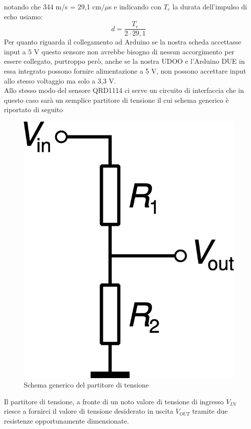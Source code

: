 notando che 344 m/s = 29,1 cm/$\mu$s e indicando con $T_e$ la durata dell'impulso 
di echo usiamo:
$$d=\frac{T_e}{2\cdot29,1}$$
Per quanto riguarda il collegamento ad Arduino se la nostra scheda accettasse 
input a 5 V questo sensore non avrebbe bisogno di nessun accorgimento per essere
 collegato, purtroppo però, anche se la nostra UDOO 
e l'Arduino DUE in essa integrato possono fornire alimentazione a 5 V, non possono 
accettare input allo stesso voltaggio ma solo a 3,3 V. 
\\Allo stesso modo del sensore QRD1114 ci serve un circuito di interfaccia che 
in questo caso sarà un semplice partitore di tensione il cui schema generico è 
riportato di seguito

\begin{figure}[!htb] \center
\includegraphics[scale=0.6]{immagini/Voltage_divider.png}
\caption{Schema generico del partitore di tensione} 
\end{figure}

Il partitore di tensione, a fronte di un noto valore di tensione di ingresso 
$V_{IN}$ riesce a fornirci il valore di tensione desiderato in uscita $V_{OUT}$ 
tramite due resistenze opportunamente dimensionate. 

